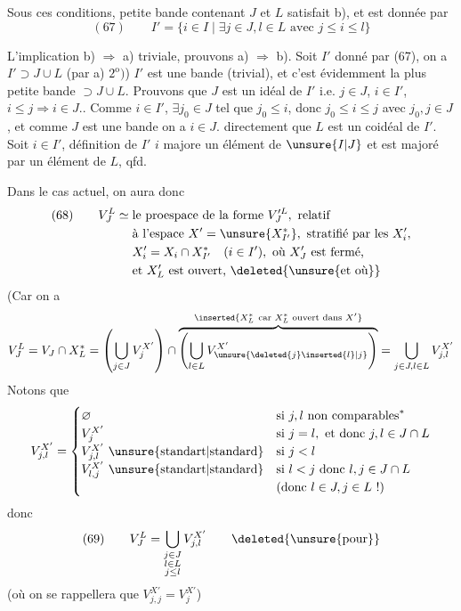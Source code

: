 Sous ces conditions,   petite bande  contenant $J$ et $L$ satisfait b), et est donnée par
\[
(67)\qquad I'=\{i\in I\mid\exists j\in J,l\in L\text{ avec }j\leq i\leq l\}
\]

 L'implication b) $\Rightarrow$ a) triviale,  prouvons a) $\Rightarrow$ b). Soit $I'$ donné par (67), on a $I'\supset J\cup L$ (par a) $2^{\mathrm o})$) $I'$ est une bande (trivial), et c'est évidemment la plus petite bande $\supset J\cup L$. Prouvons que $J$ est un idéal de $I'$ i.e. $j\in J$, $i\in I'$, $i\leq j\Rightarrow i\in J$.. Comme $i\in I'$, $\exists j_0\in J$ tel que $j_0\leq i$, donc $j_0\leq i\leq j$ avec $j_0,j\in J$, et comme $J$ est une bande  on a $i\in J$.  directement que $L$ est un coidéal de $I'$. Soit $i\in I'$,  définition de $I'$ $i$ majore un élément de $\unsure{I|J}$ et est majoré par un élément de $L$, qfd.


Dans le cas actuel, on aura donc
\[
\begin{aligned}
(68)\qquad V_J^L\simeq{}&\text{le proespace de la forme }V_J^{\prime L},\text{ relatif}\\
&\text{à l'espace }X'=\unsure{X_{I'}^*},\text{ stratifié par les }X_i',\\
&X_i'=X_i\cap X_{I'}^*\quad(i\in I'),\text{ où }X_J'\text{ est fermé,}\\
&\text{et }X_L'\text{ est ouvert, }\deleted{\unsure{\text{et où}}}
\end{aligned}
\]
(Car on a
\[
V_J^L=V_J\cap X_L^*
=\left(\bigcup_{j\in J}V_j^{X'}\right)\cap
\overbrace{\left(\bigcup_{l\in L}V_{\unsure{\deleted{j}\inserted{l}|j}}^{X'}\right)}^{\inserted{X_L^*\ \text{car }X_L^*\text{ ouvert dans }X'}}
=\bigcup_{j\in J,l\in L}V_{j,l}^{X'}
\]
Notons que
\[
V_{j,l}^{X'}=
\begin{cases}
\varnothing&\text{si }j,l\text{ non comparables}^*\\
V_j^{X'}&\text{si }j=l,\text{ et donc }j,l\in J\cap L\\
V_{j,l}^{X'}\ \text{\unsure{standart|standard}}&\text{si }j<l\\
V_{l,j}^{X'}\ \text{\unsure{standart|standard}}&\text{si }l<j\text{ donc }l,j\in J\cap L\\
&\text{(donc }l\in J,j\in L\text{ !)}
\end{cases}
\]
donc
\[
(69)\qquad V_J^L=\bigcup_{\substack{j\in J\\l\in L\\j\leq l}}V_{j,l}^{X'}\qquad\deleted{\text{\unsure{pour}}}
\]
(où on se rappellera que $V_{j,j}^{X'}=V_j^{X'}$)

